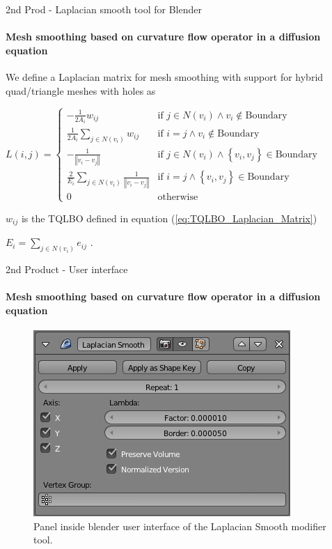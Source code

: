 \documentclass[10pt, compress, english]{beamer}
\begin{document}
\begin{frame}{2nd Prod - Laplacian smooth tool for Blender}


\framesubtitle{Mesh smoothing based on curvature flow operator in a diffusion equation}


We define a Laplacian matrix for mesh smoothing with support for hybrid
quad/triangle meshes with holes as


\begin{center}
$L(i,j)=\begin{cases}
-\frac{1}{2A_{i}}w_{ij} & \mbox{if }j\in N(v_{i})\wedge v_{i}\notin\mbox{Boundary}\\
\frac{1}{2A_{i}}\underset{j\in N\left(v_{i}\right)}{\sum}w_{ij} & \mbox{if }i=j\wedge v_{i}\notin\mbox{Boundary}\\
-\frac{1}{\left\Vert v_{i}-v_{j}\right\Vert } & \mbox{if }j\in N(v_{i})\wedge\left\{ v_{i},v_{j}\right\} \in\mbox{Boundary}\\
\frac{2}{E_{i}}\underset{j\in N\left(v_{i}\right)}{\sum}\frac{1}{\left\Vert v_{i}-v_{j}\right\Vert } & \mbox{if }i=j\wedge\left\{ v_{i},v_{j}\right\} \in\mbox{Boundary}\\
0 & \mbox{otherwise}
\end{cases}$
\par\end{center}


$w_{ij}$ is the TQLBO defined in equation (\ref{eq:TQLBO_Laplacian_Matrix})


$E_{i}=\underset{j\in N\left(v_{i}\right)}{\sum}e_{ij}$ .

\end{frame}

\begin{frame}{2nd Product - User interface}


\framesubtitle{Mesh smoothing based on curvature flow operator in a diffusion equation}


\begin{figure}[H]
\noindent \begin{centering}
\includegraphics[width=0.7\columnwidth]{img/Apinzonf_Diagram_Modifier_Panel}
\par\end{centering}

\protect\caption{Panel inside blender user interface of the Laplacian Smooth modifier
tool.}
\end{figure}


\end{frame}
\end{document}

